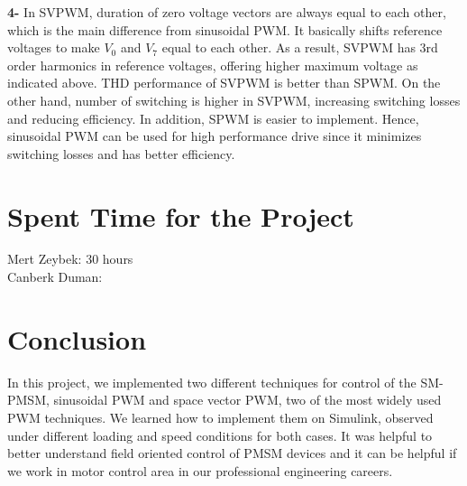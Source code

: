 \documentclass{article}
\newcommand\tab[1][1cm]{\hspace*{#1}}
\begin{document}
\textbf{4-} In SVPWM, duration of zero voltage vectors are always equal to each other, which is the main difference from sinusoidal PWM. It basically shifts reference voltages to make $V_0$ and $V_7$ equal to each other. As a result, SVPWM has 3rd order harmonics in reference voltages, offering higher maximum voltage as indicated above. THD performance of SVPWM is better than SPWM. On the other hand, number of switching is higher in SVPWM, increasing switching losses and reducing efficiency. In addition, SPWM is easier to implement. Hence, sinusoidal PWM can be used for high performance drive since it minimizes switching losses and has better efficiency.
\section{Spent Time for the Project}
Mert Zeybek: 30 hours \\
Canberk Duman: 
\section*{Conclusion}
\tab In this project, we implemented two different techniques for control of the SM-PMSM, sinusoidal PWM and space vector PWM, two of the most widely used PWM techniques. We learned how to implement them on Simulink, observed under different loading and speed conditions for both cases. It was helpful to better understand field oriented control of PMSM devices and it can be helpful if we work in motor control area in our professional engineering careers.
\end{document}
